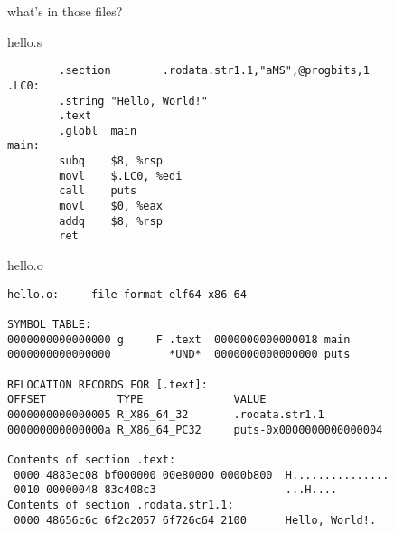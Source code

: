 \begin{frame}[label=compPipe,fragile]{what's in those files?}
\end{frame}


\begin{frame}[fragile,label=realHelloS]{hello.s}
\begin{Verbatim}
        .section        .rodata.str1.1,"aMS",@progbits,1
.LC0:
        .string "Hello, World!"
        .text
        .globl  main
main:
        subq    $8, %rsp
        movl    $.LC0, %edi
        call    puts
        movl    $0, %eax
        addq    $8, %rsp
        ret
\end{Verbatim}
\end{frame}

\begin{frame}[fragile,label=realHelloO]{hello.o}
\begin{Verbatim}
hello.o:     file format elf64-x86-64

SYMBOL TABLE:
0000000000000000 g     F .text  0000000000000018 main
0000000000000000         *UND*  0000000000000000 puts

RELOCATION RECORDS FOR [.text]:
OFFSET           TYPE              VALUE 
0000000000000005 R_X86_64_32       .rodata.str1.1
000000000000000a R_X86_64_PC32     puts-0x0000000000000004

Contents of section .text:
 0000 4883ec08 bf000000 00e80000 0000b800  H...............
 0010 00000048 83c408c3                    ...H....        
Contents of section .rodata.str1.1:
 0000 48656c6c 6f2c2057 6f726c64 2100      Hello, World!.  
\end{Verbatim}
\end{frame}
